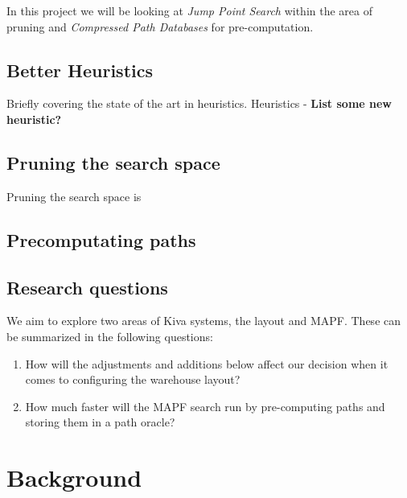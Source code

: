 \documentclass[a4paper,11pt]{article}
\begin{document}
In this project we will be looking at \textit{Jump Point Search} within the area of pruning and \textit{Compressed Path Databases} for pre-computation.

\subsection{Better Heuristics}
Briefly covering the state of the art in heuristics.
Heuristics - \textbf{List some new heuristic?} \blindtext

\subsection{Pruning the search space}
Pruning the search space is 

\subsection{Precomputating paths}


\cite{delling2009engineering} 


\newpage
\subsection{Research questions}
We aim to explore two areas of Kiva systems, the layout and MAPF. These can be summarized in the following questions:

\begin{enumerate}
	\item How will the adjustments and additions below affect our decision when it comes to configuring the warehouse layout?

\item How much faster will the MAPF search run by pre-computing paths and storing them in a path oracle?
\end{enumerate}

\section{Background}
\label{background}
\end{document}
